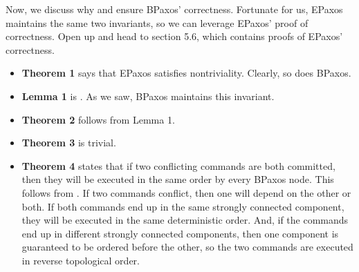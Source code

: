 Now, we discuss why  and 
ensure BPaxos' correctness. Fortunate for us, EPaxos maintains the same two
invariants, so we can leverage EPaxos' proof of correctness. Open up
\cite{moraru2013proof} and head to section 5.6, which contains proofs of
EPaxos' correctness.
\begin{itemize}
  \item
    \textbf{Theorem 1} says that EPaxos satisfies nontriviality. Clearly, so
    does BPaxos.

  \item
    \textbf{Lemma 1} is . As we saw, BPaxos maintains
    this invariant.

  \item
    \textbf{Theorem 2} follows from Lemma 1.

  \item
    \textbf{Theorem 3} is trivial.

  \item
    \textbf{Theorem 4} states that if two conflicting commands are both
    committed, then they will be executed in the same order by every BPaxos
    node. This follows from . If two commands
    conflict, then one will depend on the other or both. If both commands end
    up in the same strongly connected component, they will be executed in the
    same deterministic order. And, if the commands end up in different strongly
    connected components, then one component is guaranteed to be ordered before
    the other, so the two commands are executed in reverse topological order.
\end{itemize}

